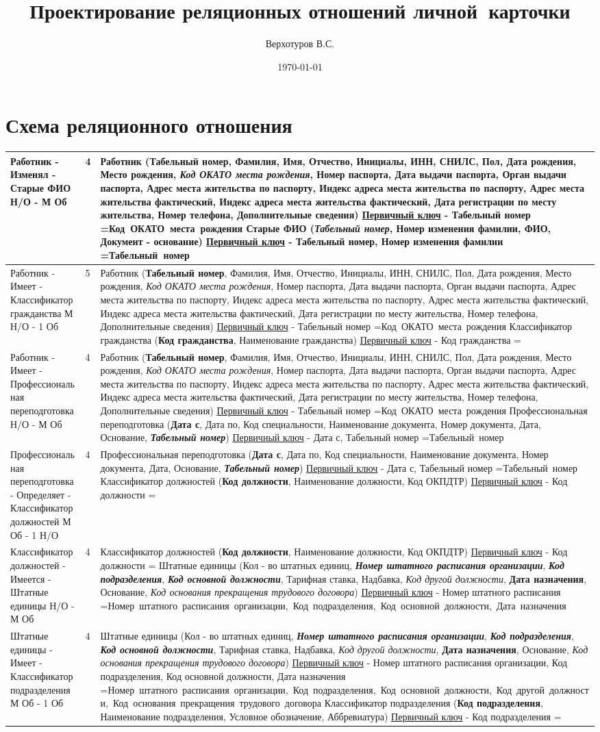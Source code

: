 \documentclass[10pt, a4paper, titlepage]{article}
\title{Проектирование реляционных отношений личной~карточки}
\author{Верхотуров В.С.}
\affil{БСБО-05-20}
\affil{РТУ МИРЭА}
\date\today
\newcommand{\pk}[1]{\textbf{#1}}
\newcommand{\fk}[1]{\textit{#1}}
\newcommand{\pfk}[1]{\pk{\fk{#1}}}
\newcommand{\firstColumn}[4]{#1 - \newline #2 - \newline #3 \newline\newline #4}
\newcommand{\thirdColumn}[6]{
#1 \newline 
\underline{Первичный ключ} - #2 \newline 
\setbox0=\hbox{#3\unskip}\ifdim\wd0=0pt
\else
  \underline{Внешний(е) ключ(-и)}: #3 \newline
\fi
#4 \newline 
\underline{Первичный ключ} - #5 \newline
\setbox0=\hbox{#6\unskip}\ifdim\wd0=0pt
\else
  \underline{Внешний(е) ключ(-и)}: #6 \newline
\fi
}
\newcommand\ruleOneOptionalManyMondatoryNum{4}
\newcommand\ruleOneOptionalManyMondatory{1 Н/О - М Об}
\newcommand\ruleManyMondatoryOneOptionalNum{4}
\newcommand\ruleManyMondatoryOneOptional{М Об - 1 Н/О}
\newcommand\ruleManyMondatoryOneMondatoryNum{4}
\newcommand\ruleManyMondatoryOneMondatory{М Об - 1 Об}
\newcommand\ruleManyOptionalOneMondatoryNum{5}
\newcommand\ruleManyOptionalOneMondatory{М Н/О - 1 Об}
\newcommand\rabotnik{Работник (\pk{Табельный номер}, Фамилия, Имя, Отчество, Инициалы, ИНН, СНИЛС, Пол, Дата рождения, Место рождения, \fk{Код ОКАТО места рождения}, Номер паспорта, Дата выдачи паспорта, Орган выдачи паспорта, Адрес места жительства по паспорту, Индекс адреса места жительства по паспорту, Адрес места жительства фактический, Индекс адреса места жительства фактический, Дата регистрации по месту жительства, Номер телефона, Дополнительные сведения)}
\newcommand\rabotnikPK{Табельный номер}
\newcommand\rabotnikFK{Код ОКАТО места рождения}
\newcommand\starieFIO{Старые ФИО (\pfk{Табельный номер}, \pk{Номер изменения фамилии}, ФИО, Документ - основание)}
\newcommand\starieFIOPK{Табельный номер, Номер изменения фамилии}
\newcommand\starieFIOFK{Табельный номер}
\newcommand\kGrazhdanstva{Классификатор гражданства (\pk{Код гражданства}, Наименование гражданства)}
\newcommand\kGrazhdanstvaPK{Код гражданства}
\newcommand\kGrazhdanstvaFK{}
\newcommand\shtatnoyeRaspisanieOrganizatsiiPK{Номер штатного расписания}
\newcommand\kPodrazdeleniya{Классификатор подразделения (\pk{Код подразделения}, Наименование подразделения, Условное обозначение, Аббревиатура)}
\newcommand\kPodrazdeleniyaPK{Код подразделения}
\newcommand\kPodrazdeleniyaFK{}
\newcommand\kDolzhostey{Классификатор должностей (\pk{Код должности}, Наименование должности, Код ОКПДТР)}
\newcommand\kDolzhosteyPK{Код должности}
\newcommand\kDolzhosteyFK{}
\newcommand\shtatnieEdinitsi{Штатные единицы (Кол - во штатных единиц, \pfk{Номер штатного расписания организации}, \pfk{Код подразделения}, \pfk{Код основной должности}, Тарифная ставка, Надбавка, \fk{Код другой должности}, \pk{Дата назначения}, Основание, \fk{Код основания прекращения трудового договора})}
\newcommand\shtatnieEdinitsiPK{Номер штатного расписания организации, Код подразделения, Код основной должности, Дата назначения}
\newcommand\shtatnieEdinitsiFK{Номер штатного расписания организации, Код подразделения, Код основной должности, Код другой должности, Код основания прекращения трудового договора}
\newcommand\professionalnayaPerepodgatovka{Профессиональная переподготовка (\pk{Дата с}, Дата по, Код специальности, Наименование документа, Номер документа, Дата, Основание, \pfk{Табельный номер})}
\newcommand\professionalnayaPerepodgatovkaPK{Дата с, Табельный номер}
\newcommand\professionalnayaPerepodgatovkaFK{Табельный номер}
\begin{document}
\maketitle

\section{Схема реляционного отношения}

\begin{center}
\begin{longtable}{ | m{3cm} | m{.1cm}| m{11cm} | }
 
 \hline
 \firstColumn{Работник}{Изменял}{Старые ФИО}{\ruleOneOptionalManyMondatory} & \ruleOneOptionalManyMondatoryNum & \thirdColumn{\rabotnik}{\rabotnikPK}{\rabotnikFK}{\starieFIO}{\starieFIOPK}{\starieFIOFK} \\ 
 
 \hline
 \firstColumn{Работник}{Имеет}{Классификатор гражданства}{\ruleManyOptionalOneMondatory} & \ruleManyOptionalOneMondatoryNum & \thirdColumn{\rabotnik}{\rabotnikPK}{\rabotnikFK}{\kGrazhdanstva}{\kGrazhdanstvaPK}{\kGrazhdanstvaFK} \\ 
 
 \hline
 \firstColumn{Работник}{Имеет}{Профессиональная переподготовка}{\ruleOneOptionalManyMondatory} & \ruleOneOptionalManyMondatoryNum & \thirdColumn{\rabotnik}{\rabotnikPK}{\rabotnikFK}{\professionalnayaPerepodgatovka}{\professionalnayaPerepodgatovkaPK}{\professionalnayaPerepodgatovkaFK} \\ 
 
 \hline
 \firstColumn{Профессиональная переподготовка}{Определяет}{Классификатор должностей}{\ruleManyMondatoryOneOptional} & \ruleManyMondatoryOneOptionalNum & \thirdColumn{\professionalnayaPerepodgatovka}{\professionalnayaPerepodgatovkaPK}{\professionalnayaPerepodgatovkaFK}{\kDolzhostey}{\kDolzhosteyPK}{\kDolzhosteyFK} \\ 
 
 \hline
 \firstColumn{Классификатор должностей}{Имеется}{Штатные единицы}{\ruleOneOptionalManyMondatory} & \ruleOneOptionalManyMondatoryNum & \thirdColumn{\kDolzhostey}{\kDolzhosteyPK}{\kDolzhosteyFK}{\shtatnieEdinitsi}{\shtatnoyeRaspisanieOrganizatsiiPK}{\shtatnieEdinitsiPK} \\ 
 
 \hline
 \firstColumn{Штатные единицы}{Имеет}{Классификатор подразделения}{\ruleManyMondatoryOneMondatory} & \ruleManyMondatoryOneMondatoryNum & \thirdColumn{\shtatnieEdinitsi}{\shtatnieEdinitsiPK}{\shtatnieEdinitsiFK}{\kPodrazdeleniya}{\kPodrazdeleniyaPK}{\kPodrazdeleniyaFK} \\ 
 

\end{longtable}
\end{center}
\end{document}
